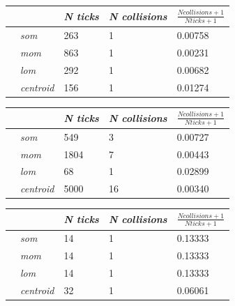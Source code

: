 \documentclass[conference]{IEEEtran}
\begin{document}
\begin{center}
\begin{tabular}{ | m{2.8em} | m{3em} | m{2.8em} | m{5em} | m{5.2em} | }
\hline
{} & \textit{N ticks} & \textit{N collisions} & $\frac{N collisions + 1}{N ticks + 1}$ \\
\hline
{} & \textit{som} & 263 & 1 & 0.00758 \\
 & \textit{mom} & 863 & 1 & 0.00231 \\
 & \textit{lom} & 292 & 1 & 0.00682 \\
 & \textit{centroid} & 156 & 1 & 0.01274 \\
\hline
\end{tabular}
\label{table:ps5e2amax}
\end{center}

\begin{center}
\begin{tabular}{ | m{2.8em} | m{3em} | m{2.8em} | m{5em} | m{5.2em} | }
\hline
{} & \textit{N ticks} & \textit{N collisions} & $\frac{N collisions + 1}{N ticks + 1}$ \\
\hline
{} & \textit{som} & 549 & 3 & 0.00727 \\
 & \textit{mom} & 1804 & 7 & 0.00443 \\
 & \textit{lom} & 68 & 1 & 0.02899 \\
 & \textit{centroid} & 5000 & 16 & 0.00340 \\
\hline
\end{tabular}
\label{table:ps5e2asum}
\end{center}





\begin{center}
\begin{tabular}{ | m{2.8em} | m{3em} | m{2.8em} | m{5em} | m{5.2em} | }
\hline
{} & \textit{N ticks} & \textit{N collisions} & $\frac{N collisions + 1}{N ticks + 1}$ \\
\hline
{} & \textit{som} & 14 & 1 & 0.13333 \\
 & \textit{mom} & 14 & 1 & 0.13333 \\
 & \textit{lom} & 14 & 1 & 0.13333 \\
 & \textit{centroid} & 32 & 1 & 0.06061 \\
\hline
\end{tabular}
\label{table:ps10e1amax}
\end{center}
\end{document}
